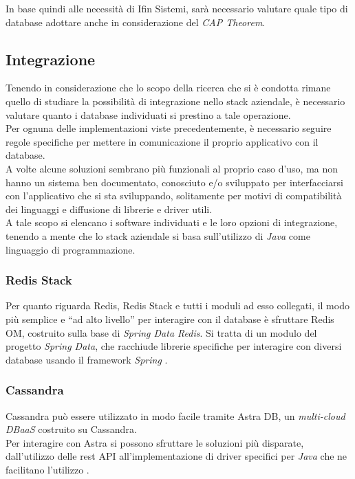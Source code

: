 \noindent In base quindi alle necessità di Ifin Sistemi, sarà necessario valutare quale tipo di database adottare anche in considerazione del \textit{CAP Theorem}.

\subsection{Integrazione}
Tenendo in considerazione che lo scopo della ricerca che si è condotta rimane quello di studiare la possibilità di integrazione nello stack aziendale, è necessario valutare quanto i database individuati si prestino a tale operazione.\\

\noindent Per ognuna delle implementazioni viste precedentemente, è necessario seguire regole specifiche per mettere in comunicazione il proprio applicativo con il database.\\
A volte alcune soluzioni sembrano più funzionali al proprio caso d'uso, ma non hanno un sistema ben documentato, conosciuto e/o sviluppato per interfacciarsi con l'applicativo che si sta sviluppando, solitamente per motivi di compatibilità dei linguaggi e diffusione di librerie e driver utili.\\
A tale scopo si elencano i software individuati e le loro opzioni di integrazione, tenendo a mente che lo stack aziendale si basa sull'utilizzo di \textit{Java} come linguaggio di programmazione.

\subsubsection{Redis Stack}
Per quanto riguarda Redis, Redis Stack e tutti i moduli ad esso collegati, il modo più semplice e ``ad alto livello'' per interagire con il database è sfruttare Redis OM, costruito sulla base di \textit{Spring Data Redis}. Si tratta di un modulo del progetto \textit{Spring Data}, che racchiude librerie specifiche per interagire con diversi database usando il framework \textit{Spring} \cite{site:udemyredis}.

\subsubsection{Cassandra}
Cassandra può essere utilizzato in modo facile tramite Astra DB, un \textit{multi-cloud \gls{DBaaS}} costruito su Cassandra.\\
Per interagire con Astra si possono sfruttare le soluzioni più disparate, dall'utilizzo delle \gls{rest API} all'implementazione di driver specifici per \textit{Java} che ne facilitano l'utilizzo \cite{site:udemycassandra}.

